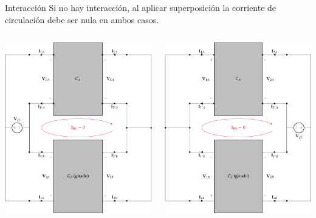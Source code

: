\documentclass[xcolor={usenames,svgnames,dvipsnames}]{beamer}
\begin{document}
\begin{frame}[label={sec:org12088a9},plain]{Interacción}
Si no hay interacción, al aplicar superposición la corriente de circulación debe ser nula \alert{en ambos casos}.
\begin{columns}
\begin{column}{0.65\columnwidth}
\begin{center}
\includegraphics[width=.9\linewidth]{figs/paralelo-paralelo-superposicion-entrada.pdf}
\end{center}
\end{column}
\begin{column}{0.65\columnwidth}
\begin{center}
\includegraphics[width=.9\linewidth]{figs/paralelo-paralelo-superposicion-salida.pdf}

\end{center}
\end{column}
\end{columns}
\end{frame}
\end{document}
